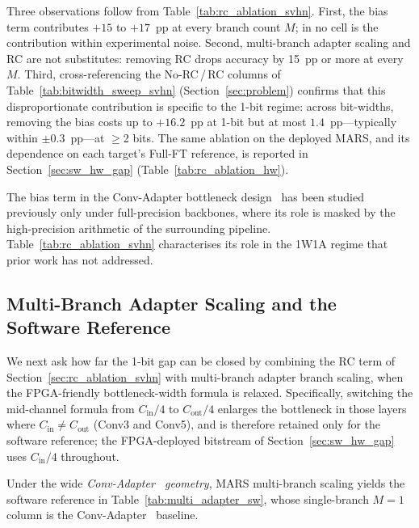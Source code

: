 \documentclass[12pt, a4paper]{report}
\numberwithin{equation}{chapter}
\numberwithin{figure}{chapter}
\numberwithin{table}{chapter}
\numberwithin{algorithm}{chapter}
\begin{document}
Three observations follow from Table~\ref{tab:rc_ablation_svhn}. First, the bias term contributes $+15$ to $+17$~pp at every branch count $M$; in no cell is the contribution within experimental noise. Second, multi-branch adapter scaling and RC are not substitutes: removing RC drops accuracy by 15~pp or more at every $M$. Third, cross-referencing the No-RC\,/\,RC columns of Table~\ref{tab:bitwidth_sweep_svhn} (Section~\ref{sec:problem}) confirms that this disproportionate contribution is specific to the 1-bit regime: across bit-widths, removing the bias costs up to $+16.2$~pp at 1-bit but at most $1.4$~pp---typically within $\pm 0.3$~pp---at $\geq$2 bits. The same ablation on the deployed MARS, and its dependence on each target's Full-FT reference, is reported in Section~\ref{sec:sw_hw_gap} (Table~\ref{tab:rc_ablation_hw}).

The bias term in the Conv-Adapter bottleneck design~\cite{Chen2024ConvAdapter} has been studied previously only under full-precision backbones, where its role is masked by the high-precision arithmetic of the surrounding pipeline. Table~\ref{tab:rc_ablation_svhn} characterises its role in the 1W1A regime that prior work has not addressed.

\subsection{Multi-Branch Adapter Scaling and the Software Reference}
\label{sec:v6_multi_adapter}

We next ask how far the 1-bit gap can be closed by combining the RC term of Section~\ref{sec:rc_ablation_svhn} with multi-branch adapter branch scaling, when the FPGA-friendly bottleneck-width formula is relaxed. Specifically, switching the mid-channel formula from $C_{\text{in}}/4$ to $C_{\text{out}}/4$ enlarges the bottleneck in those layers where $C_{\text{in}} \neq C_{\text{out}}$ (Conv3 and Conv5), and is therefore retained only for the software reference; the FPGA-deployed bitstream of Section~\ref{sec:sw_hw_gap} uses $C_{\text{in}}/4$ throughout.

Under the wide \emph{Conv-Adapter~\cite{Chen2024ConvAdapter} geometry}, MARS multi-branch scaling yields the software reference in Table~\ref{tab:multi_adapter_sw}, whose single-branch $M{=}1$ column is the Conv-Adapter~\cite{Chen2024ConvAdapter} baseline.
\end{document}
